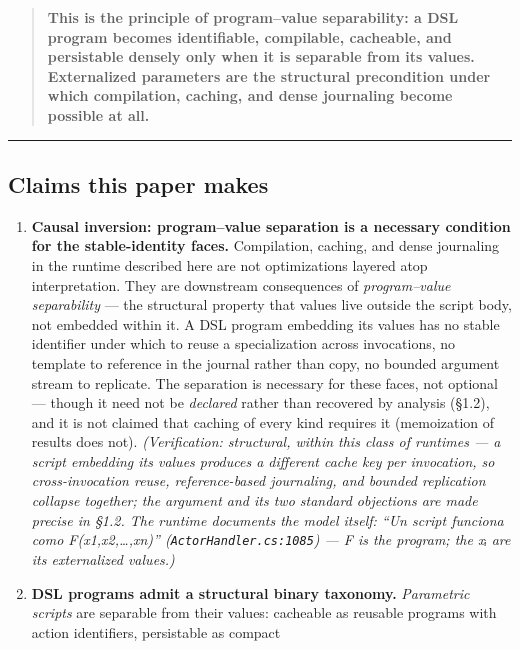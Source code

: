 \documentclass[
]{article}
\let\origtexttt\texttt%
\renewcommand{\texttt}[1]{\origtexttt{\seqsplit{#1}}}%
\let\texttt\origtexttt%
\begin{document}
\begin{quote}
\textbf{This is the principle of program--value separability: a DSL
program becomes identifiable, compilable, cacheable, and persistable
densely only when it is separable from its values. Externalized
parameters are the structural precondition under which compilation,
caching, and dense journaling become possible at all.}
\end{quote}

\begin{center}\rule{0.5\linewidth}{0.5pt}\end{center}

\subsection{Claims this paper makes}\label{claims-this-paper-makes}

\begin{enumerate}
\def\labelenumi{\arabic{enumi}.}
\item
  \textbf{Causal inversion: program--value separation is a necessary
  condition for the stable-identity faces.} Compilation, caching, and
  dense journaling in the runtime described here are not optimizations
  layered atop interpretation. They are downstream consequences of
  \emph{program--value separability} --- the structural property that
  values live outside the script body, not embedded within it. A DSL
  program embedding its values has no stable identifier under which to
  reuse a specialization across invocations, no template to reference in
  the journal rather than copy, no bounded argument stream to replicate.
  The separation is necessary for these faces, not optional --- though
  it need not be \emph{declared} rather than recovered by analysis
  (§1.2), and it is not claimed that caching of every kind requires it
  (memoization of results does not). \emph{(Verification: structural,
  within this class of runtimes --- a script embedding its values
  produces a different cache key per invocation, so cross-invocation
  reuse, reference-based journaling, and bounded replication collapse
  together; the argument and its two standard objections are made
  precise in §1.2. The runtime documents the model itself: ``Un script
  funciona como F(x1,x2,\ldots,xn)'' (\texttt{ActorHandler.cs:1085}) ---
  F is the program; the xᵢ are its externalized values.)}
\item
  \textbf{DSL programs admit a structural binary taxonomy.}
  \emph{Parametric scripts} are separable from their values: cacheable
  as reusable programs with action identifiers, persistable as compact

\end{enumerate}
\end{document}
